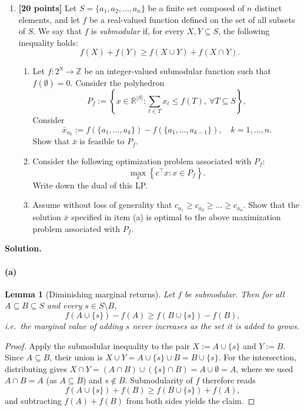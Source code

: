 \documentclass[11pt,letterpaper]{article}
\newtheorem{lemma}[theorem]{Lemma}
\theoremstyle{definition}
\newcommand{\reals}{\mathbb{R}}
\newcommand{\solution}{\medskip\noindent\textbf{Solution.}\par\medskip}
\begin{document}
\begin{enumerate}[resume=q]
\item \textbf{[20 points]} Let $S = \{a_1, a_2, \ldots, a_n\}$ be a finite set composed of $n$ distinct elements, and let $f$ be a real-valued function defined on the set of all subsets of $S$. We say that $f$ is \emph{submodular} if, for every $X, Y \subseteq S$, the following inequality holds:
\[
f(X) + f(Y) \geq f(X \cup Y) + f(X \cap Y).
\]
\begin{enumerate}
\item Let $f : 2^S \to \mathbb{Z}$ be an integer-valued submodular function such that $f(\emptyset) = 0$. Consider the polyhedron
\[
P_f := \left\{ x \in \reals^{|S|} : \sum_{t \in T} x_t \leq f(T), \ \forall T \subseteq S \right\},
\]
Consider
\[
\bar{x}_{a_k} := f(\{a_1, \ldots, a_k\}) - f(\{a_1, \ldots, a_{k-1}\}), \quad k = 1, \ldots, n.
\]
Show that $\bar{x}$ is feasible to $P_f$.
\item Consider the following optimization problem associated with $P_f$:
\[
\max_x \left\{ c^\top x : x \in P_f \right\}.
\]
Write down the dual of this LP.
\item Assume without loss of generality that $c_{a_1} \geq c_{a_2} \geq \ldots \geq c_{a_n}$. Show that the solution $\bar{x}$ specified in item (a) is optimal to the above maximization problem associated with $P_f$.
\end{enumerate}
\end{enumerate}

\solution

\paragraph{(a)}

\begin{lemma}[Diminishing marginal returns]\label{lem:dmr}
    Let $f$ be submodular. Then for all $A \subseteq B \subseteq S$ and every $s \in S \setminus B$,
    \[
        f(A \cup \{s\}) - f(A) \geq f(B \cup \{s\}) - f(B),
    \]
    i.e.\ the marginal value of adding $s$ never increases as the set it is added to grows.
\end{lemma}
\begin{proof}
    Apply the submodular inequality to the pair $X := A \cup \{s\}$ and $Y := B$.
    Since $A \subseteq B$, their union is $X \cup Y = A \cup \{s\} \cup B = B \cup \{s\}$.
    For the intersection, distributing gives $X \cap Y = (A \cap B) \cup (\{s\} \cap B) = A \cup \emptyset = A$,
    where we used $A \cap B = A$ (as $A \subseteq B$) and $s \notin B$.
    Submodularity of $f$ therefore reads
    \[
        f(A \cup \{s\}) + f(B) \geq f(B \cup \{s\}) + f(A),
    \]
    and subtracting $f(A) + f(B)$ from both sides yields the claim.
\end{proof}
\end{document}
